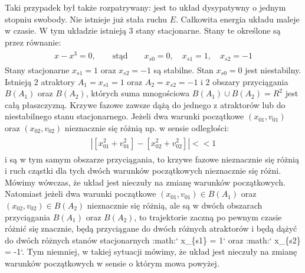 \documentclass[a4paper,12pt,polish]{sphinxmanual}
\begin{document}
Taki przypadek był także rozpatrywany: jest to układ dysypatywny o jednym stopniu swobody. Nie istnieje już stała ruchu $E$.  Całkowita energia układu maleje w czasie.  W tym układzie  istnieją 3 stany stacjonarne. Stany te określone są przez równanie:
\label{ch2/chII011:equation-eqn14}\begin{gather}
\begin{split}x-x^3=0, \qquad \mbox{stąd} \qquad x_{s0}=0, \quad x_{s1} = 1, \quad x_{s2} = -1\end{split}\label{ch2/chII011-eqn14}
\end{gather}
Stany stacjonarne $x_{s1} = 1$ oraz $x_{s2} = -1$  są  stabilne. Stan $x_{s0}=0$ jest niestabilny. Istnieją 2 atraktory  $A_1= x_{s1} = 1$ oraz $A_2= x_{s2} = -1$ i  2 obszary przyciągania $B(A_1)$ oraz $B(A_2)$, których suma mnogościowa $B(A_1) \cup  B(A_2) = R^2$ jest całą płaszczyzną.  Krzywe fazowe  zawsze dążą do jednego z atraktorów lub do niestabilnego stanu stacjonarnego. Jeżeli dwa warunki początkowe $(x_{01}, v_{01})$  oraz  $(x_{02}, v_{02})$ nieznacznie się różnią np. w sensie odległości:
\label{ch2/chII011:equation-eqn15}\begin{gather}
\begin{split}| [x_{01}^2 +  v_{01}^2] - [x_{02}^2 +  v_{02}^2] | << 1\end{split}\label{ch2/chII011-eqn15}
\end{gather}
i są w tym samym obszarze przyciągania, to krzywe fazowe nieznacznie się różnią i ruch cząstki dla tych dwóch warunków początkowych nieznacznie się różni. Mówimy wówczas, że układ jest nieczuły na zmianę warunków początkowych. Natomiast jeżeli dwa warunki początkowe $(x_{01}, v_{01}) \in B(A_1)$  oraz  $(x_{02}, v_{02}) \in B(A_2)$ nieznacznie się różnią, ale są w dwóch obszarach przyciągania $B(A_1)$ oraz $B(A_2)$, to trajektorie zaczną po pewnym czasie różnić się znacznie, będą przyciągane do dwóch różnych atraktorów  i będą dążyć  do dwóch różnych stanów stacjonarnych :math:{}` x\_\{s1\} = 1{}` oraz :math:{}` x\_\{s2\} = -1{}`. Tym niemniej, w takiej sytuacji mówimy, że układ jest nieczuły na zmianę warunków początkowych w sensie o którym mowa powyżej.
\end{document}

